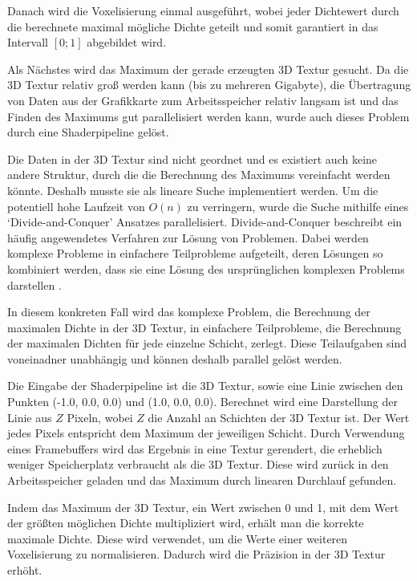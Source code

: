 \documentclass[a4paper,fontsize=12pt,toc=bib,halfparskip]{scrartcl}
\begin{document}
Danach wird die Voxelisierung einmal ausgef\"uhrt, wobei jeder Dichtewert durch die berechnete maximal m\"ogliche Dichte geteilt und somit garantiert in das Intervall $[0;1]$ abgebildet wird. 

Als N\"achstes wird das Maximum der gerade erzeugten 3D Textur gesucht. Da die 3D Textur relativ gro{\ss} werden kann (bis zu mehreren Gigabyte), die \"Ubertragung von Daten aus der Grafikkarte zum Arbeitsspeicher relativ langsam ist und das Finden des Maximums gut parallelisiert werden kann, wurde auch dieses Problem durch eine Shaderpipeline gel\"ost. 

Die Daten in der 3D Textur sind nicht geordnet und es existiert auch keine andere Struktur, durch die die Berechnung des Maximums vereinfacht werden k\"onnte. Deshalb musste sie als lineare Suche implementiert werden. Um die potentiell hohe Laufzeit von $O(n)$ zu verringern, wurde die Suche  mithilfe eines `Divide-and-Conquer' Ansatzes parallelisiert. Divide-and-Conquer beschreibt ein h\"aufig angewendetes Verfahren zur L\"osung von Problemen. Dabei werden komplexe Probleme in einfachere Teilprobleme aufgeteilt, deren L\"osungen so kombiniert werden, dass sie eine L\"osung des urspr\"unglichen komplexen Problems darstellen \cite{jordan1994hierarchical}.

In diesem konkreten Fall wird das komplexe Problem, die Berechnung der maximalen Dichte in der 3D Textur, in einfachere Teilprobleme, die Berechnung der maximalen Dichten f\"ur jede einzelne Schicht, zerlegt. Diese Teilaufgaben sind voneinadner unabh\"angig und k\"onnen deshalb parallel gel\"ost werden.

Die Eingabe der Shaderpipeline ist die 3D Textur, sowie eine Linie zwischen den Punkten (-1.0, 0.0, 0.0) und (1.0, 0.0, 0.0). Berechnet wird eine Darstellung der Linie aus $Z$ Pixeln, wobei $Z$ die Anzahl an Schichten der 3D Textur ist. Der Wert jedes Pixels entspricht dem Maximum der jeweiligen Schicht. Durch Verwendung eines Framebuffers wird das Ergebnis in eine Textur gerendert, die erheblich weniger Speicherplatz verbraucht als die 3D Textur. Diese wird zur\"uck in den Arbeitsspeicher geladen und das Maximum durch linearen Durchlauf gefunden.

Indem das Maximum der 3D Textur, ein Wert zwischen 0 und 1, mit dem Wert der gr\"o{\ss}ten m\"oglichen Dichte multipliziert wird, erh\"alt man die korrekte maximale Dichte. Diese wird verwendet, um die Werte einer weiteren Voxelisierung zu normalisieren. Dadurch wird die Pr\"azision in der 3D Textur erh\"oht.
\end{document}
